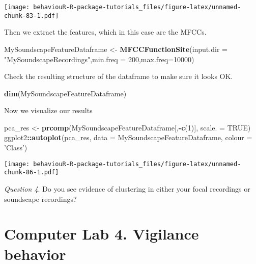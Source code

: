 \documentclass[]{book}
\newenvironment{Shaded}{\begin{snugshade}}{\end{snugshade}}
\newcommand{\DataTypeTok}[1]{\textcolor[rgb]{0.13,0.29,0.53}{#1}}
\newcommand{\DecValTok}[1]{\textcolor[rgb]{0.00,0.00,0.81}{#1}}
\newcommand{\KeywordTok}[1]{\textcolor[rgb]{0.13,0.29,0.53}{\textbf{#1}}}
\newcommand{\NormalTok}[1]{#1}
\newcommand{\OperatorTok}[1]{\textcolor[rgb]{0.81,0.36,0.00}{\textbf{#1}}}
\newcommand{\OtherTok}[1]{\textcolor[rgb]{0.56,0.35,0.01}{#1}}
\newcommand{\StringTok}[1]{\textcolor[rgb]{0.31,0.60,0.02}{#1}}
\begin{document}
\texttt{[image: behaviouR-R-package-tutorials\_files/figure-latex/unnamed-chunk-83-1.pdf]}

Then we extract the features, which in this case are the MFCCs.

\begin{Shaded}
\begin{Highlighting}[]
\NormalTok{MySoundscapeFeatureDataframe <-}\StringTok{ }
\StringTok{  }\KeywordTok{MFCCFunctionSite}\NormalTok{(}\DataTypeTok{input.dir =} \StringTok{"MySoundscapeRecordings"}\NormalTok{,}\DataTypeTok{min.freq =} \DecValTok{200}\NormalTok{,}\DataTypeTok{max.freq=}\DecValTok{10000}\NormalTok{)}
\end{Highlighting}
\end{Shaded}

Check the resulting structure of the dataframe to make sure it looks OK.

\begin{Shaded}
\begin{Highlighting}[]
\KeywordTok{dim}\NormalTok{(MySoundscapeFeatureDataframe)}
\end{Highlighting}
\end{Shaded}

Now we visualize our results

\begin{Shaded}
\begin{Highlighting}[]
\NormalTok{pca_res <-}\StringTok{ }\KeywordTok{prcomp}\NormalTok{(MySoundscapeFeatureDataframe[,}\OperatorTok{-}\KeywordTok{c}\NormalTok{(}\DecValTok{1}\NormalTok{)], }\DataTypeTok{scale. =} \OtherTok{TRUE}\NormalTok{)}
\NormalTok{ggplot2}\OperatorTok{::}\KeywordTok{autoplot}\NormalTok{(pca_res, }\DataTypeTok{data =}\NormalTok{ MySoundscapeFeatureDataframe, }
         \DataTypeTok{colour =} \StringTok{'Class'}\NormalTok{)}
\end{Highlighting}
\end{Shaded}

\texttt{[image: behaviouR-R-package-tutorials\_files/figure-latex/unnamed-chunk-86-1.pdf]}

\emph{Question 4}. Do you see evidence of clustering in either your focal recordings or soundscape recordings?

\hypertarget{computer-lab-4.-vigilance-behavior}{%
\chapter*{Computer Lab 4. Vigilance behavior}\label{computer-lab-4.-vigilance-behavior}}
\end{document}
